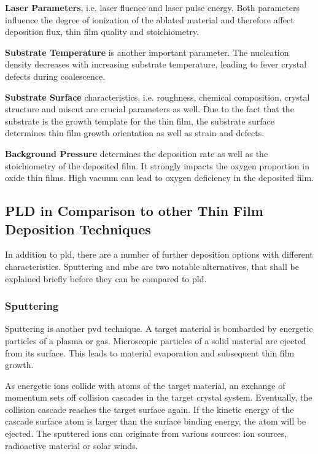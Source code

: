 \textbf{Laser Parameters}, i.e. laser fluence and laser pulse energy.
Both parameters influence the degree of ionization of the ablated material and therefore
affect deposition flux, thin film quality and stoichiometry. 

\textbf{Substrate Temperature} is another important parameter. 
The nucleation density decreases with increasing substrate temperature, leading to 
fever crystal defects during coalescence.

\textbf{Substrate Surface} characteristics, i.e. roughness, chemical composition, 
crystal structure and miscut are crucial parameters as well.
Due to the fact that the substrate is the growth template for the thin film, 
the substrate surface determines thin film growth orientation as well as strain and 
defects.

\textbf{Background Pressure} determines
the deposition rate as well as the stoichiometry of the deposited film.
It strongly impacts the oxygen proportion in oxide thin films.
High vacuum can lead to oxygen deficiency in the deposited film.

\subsection{PLD in Comparison to other Thin Film Deposition Techniques}
In addition to \ac{pld}, there are a number of further deposition options 
with different characteristics. 
Sputtering and \ac{mbe} are two notable alternatives, that shall be explained briefly
before they can be compared to \ac{pld}.

\subsubsection{Sputtering}
Sputtering is another \ac{pvd} technique. 
A target material is bombarded by energetic particles of a plasma or gas.
Microscopic particles of a solid material are ejected from its surface.
This leads to material evaporation and subsequent thin film growth. 

As energetic ions collide with atoms of the target material, 
an exchange of momentum sets off collision cascades in the target crystal system.
Eventually, the collision cascade reaches the target surface again. 
If the kinetic energy of the cascade surface atom is larger than the surface binding 
energy, the atom will be ejected.
The sputtered ions can originate from various sources: ion sources, radioactive material
or solar winds.

